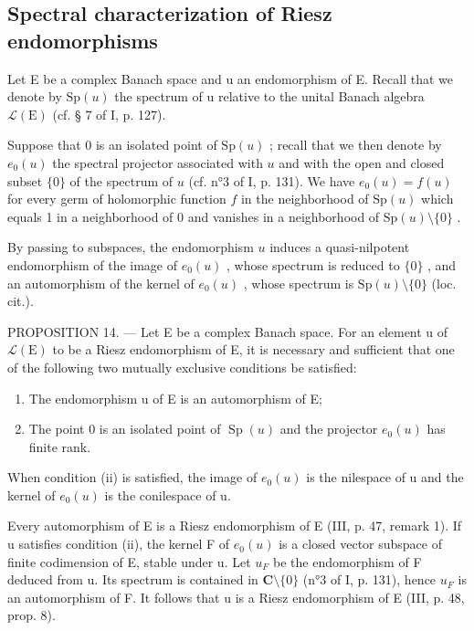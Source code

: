\subsection{Spectral characterization of Riesz endomorphisms}

Let E be a complex Banach space and u an endomorphism of E. Recall that we denote by \(\mathrm{Sp}(u)\) the spectrum of u relative to the unital Banach algebra \(\mathcal{L}(\mathrm{E})\) (cf. § 7 of I, p. 127).

Suppose that 0 is an isolated point of \(\mathrm{Sp}(u)\) ; recall that we then denote by \(e_0(u)\) the spectral projector associated with \(u\) and with the open and closed subset \(\{0\}\) of the spectrum of \(u\) (cf. n°3 of I, p. 131). We have \(e_0(u) = f(u)\) for every germ of holomorphic function \(f\) in the neighborhood of \(\mathrm{Sp}(u)\) which equals 1 in a neighborhood of 0 and vanishes in a neighborhood of \(\mathrm{Sp}(u) \setminus \{0\}\) .

By passing to subspaces, the endomorphism \(u\) induces a quasi-nilpotent endomorphism of the image of \(e_0(u)\) , whose spectrum is reduced to \(\{0\}\) , and an automorphism of the kernel of \(e_0(u)\) , whose spectrum is \(\mathrm{Sp}(u) \setminus \{0\}\) (loc. cit.).

PROPOSITION 14. --- Let E be a complex Banach space. For an element u of \(\mathcal{L}(\mathrm{E})\) to be a Riesz endomorphism of E, it is necessary and sufficient that one of the following two mutually exclusive conditions be satisfied:

\begin{enumerate}
\def\labelenumi{(\roman{enumi})}
\item
  The endomorphism u of E is an automorphism of E;
\item
  The point 0 is an isolated point of \(\operatorname{Sp}(u)\) and the projector \(e_0(u)\) has finite rank.
\end{enumerate}

When condition (ii) is satisfied, the image of \(e_{0}(u)\) is the nilespace of u and the kernel of \(e_{0}(u)\) is the conilespace of u.

Every automorphism of E is a Riesz endomorphism of E (III, p. 47, remark 1). If u satisfies condition (ii), the kernel F of \(e_{0}(u)\) is a closed vector subspace of finite codimension of E, stable under u. Let \(u_{F}\) be the endomorphism of F deduced from u. Its spectrum is contained in \(\mathbf{C}\setminus\{0\}\) (n°3 of I, p. 131), hence \(u_{F}\) is an automorphism of F. It follows that u is a Riesz endomorphism of E (III, p. 48, prop. 8).

